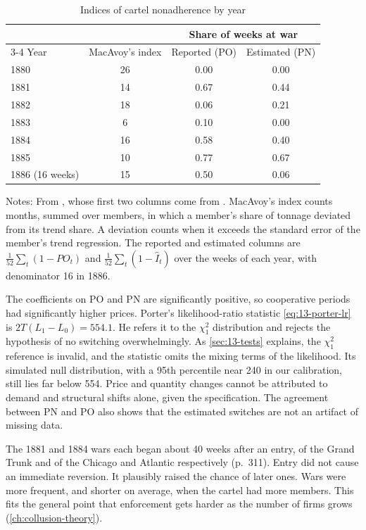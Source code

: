 \begin{table}[htbp]
\centering
\caption{Indices of cartel nonadherence by year}\label{tab:13-porter-t5}
\small
\begin{tabular}{@{}lccc@{}}
\toprule
 & & \multicolumn{2}{c}{Share of weeks at war}\\
\cmidrule(l){3-4}
Year & MacAvoy's index & Reported (PO) & Estimated (PN)\\
\midrule
1880 & 26 & 0.00 & 0.00\\
1881 & 14 & 0.67 & 0.44\\
1882 & 18 & 0.06 & 0.21\\
1883 & 6 & 0.10 & 0.00\\
1884 & 16 & 0.58 & 0.40\\
1885 & 10 & 0.77 & 0.67\\
1886 (16 weeks) & 15 & 0.50 & 0.06\\
\bottomrule
\end{tabular}

\smallskip
\begin{minipage}{0.95\textwidth}\footnotesize
Notes: From \citet[Table~5]{Porter1983}, whose first two columns come from \citet{Ulen1979}. MacAvoy's index counts
months, summed over members, in which a member's share of tonnage deviated from its trend share. A deviation counts
when it exceeds the standard error of the member's trend regression. The reported and estimated columns are
$\frac{1}{52}\sum_t(1 - PO_t)$ and $\frac{1}{52}\sum_t(1 - \hat I_t)$ over the weeks of each year, with denominator 16
in 1886.
\end{minipage}
\end{table}

The coefficients on PO and PN are significantly positive, so cooperative periods had significantly higher prices.
Porter's likelihood-ratio statistic \eqref{eq:13-porter-lr} is $2T(L_1 - L_0) = 554.1$. He refers it to the
$\chi^2_1$ distribution and rejects the hypothesis of no switching overwhelmingly. As \cref{sec:13-tests} explains,
the $\chi^2_1$ reference is invalid, and the statistic omits the mixing terms of the likelihood. Its simulated null
distribution, with a 95th percentile near 240 in our calibration, still lies far below 554. Price and quantity
changes cannot be attributed to demand and structural shifts alone, given the specification. The agreement between
PN and PO also shows that the estimated switches are not an artifact of missing data.

The 1881 and 1884 wars each began about 40 weeks after an entry, of the Grand Trunk and of the Chicago and Atlantic
respectively (p.~311). Entry did not cause an immediate reversion. It plausibly raised the chance of later
ones. Wars were more frequent, and shorter on average, when the cartel had more members. This fits the general
point that enforcement gets harder as the number of firms grows (\cref{ch:collusion-theory}).

